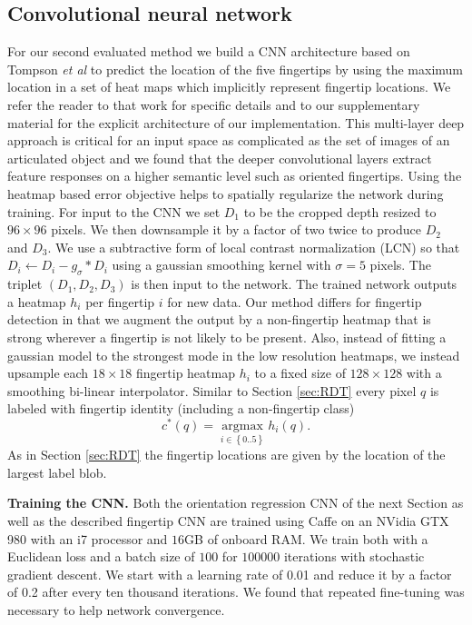 \documentclass{bmvc2k}
\def\etal{\emph{et al}\bmvaOneDot}
\begin{document}
\subsection{Convolutional neural network} \label{sec:CNN}
For our second evaluated method we build a CNN architecture based on Tompson \etal \cite{tompson14tog} to predict the location of the five fingertips by using the maximum location in a set of heat maps which implicitly represent fingertip locations. We refer the reader to that work for specific details and to our supplementary material for the explicit architecture of our implementation. This multi-layer deep approach is critical for an input space as 
complicated as the set of images of an articulated object and we found that the deeper convolutional layers extract feature responses on a higher semantic level such as oriented fingertips. Using the heatmap based error objective helps to spatially regularize the network during training. For input to the CNN we set $D_1$ to be the cropped depth resized to $96\times 96$ pixels. We then downsample it by a factor of two twice to produce $D_2$ and $D_3$. We use a subtractive form of local contrast normalization (LCN) \cite{tompson14tog,jarret} so that $D_i \leftarrow D_i - g_{\sigma}*D_i$ using a gaussian smoothing kernel with $\sigma=5$ pixels. The triplet $\left(D_1,D_2,D_3\right)$ is then input to the network. The trained network outputs a heatmap $h_i$ per fingertip $i$ for new data. Our method differs for fingertip detection in that we augment the output by a non-fingertip heatmap that is strong wherever a fingertip is not likely to be present. Also, instead of fitting a gaussian model to the strongest mode in the low resolution heatmaps, we instead upsample each $18\times 18$ fingertip heatmap $h_i$ to a fixed size of $128\times 128$ with a smoothing bi-linear interpolator. Similar to Section \ref{sec:RDT} every pixel $q$ is labeled with fingertip identity (including a non-fingertip class)
\begin{equation}\label{eq:cnnEq}
c^*\left(q\right) = \mathop {\arg \max }\limits_{i \in \left\{0 .. 5 \right\}} h_i\left(q\right).
\end{equation}
As in Section \ref{sec:RDT} the fingertip locations are given by the location of the largest label blob.

\textbf{Training the CNN.} 
Both the orientation regression CNN of the next Section as well as the described fingertip CNN are trained using Caffe \cite{jia2014caffe} on an NVidia GTX 980 with an i7 processor and $16$GB of onboard RAM. We train both with a Euclidean loss and a batch size of $100$ for $100000$ iterations with stochastic gradient descent. We start with a learning rate of 0.01 and reduce it by a factor of 0.2 after every ten thousand iterations. We found that repeated fine-tuning was necessary to help network convergence.
\end{document}
